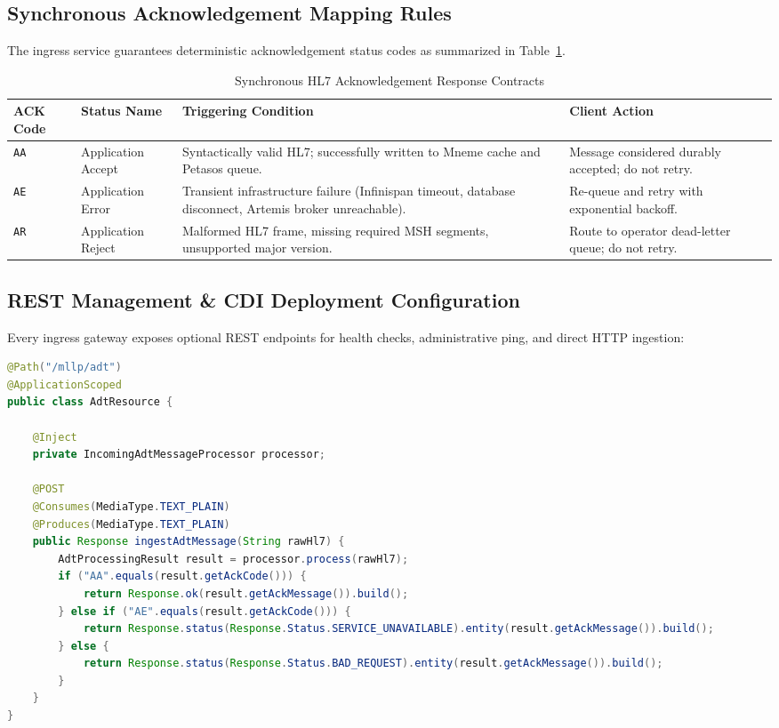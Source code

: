\subsection{Synchronous Acknowledgement Mapping Rules}

The ingress service guarantees deterministic acknowledgement status codes as summarized in Table~\ref{tab:ack_rules}.

\begin{table}[htbp]
\centering
\small
\begin{tabularx}{\textwidth}{l l p{6.0cm} p{3.0cm}}
\toprule
\textbf{ACK Code} & \textbf{Status Name} & \textbf{Triggering Condition} & \textbf{Client Action} \\
\midrule
\texttt{AA} & Application Accept & Syntactically valid HL7; successfully written to Mneme cache and Petasos queue. & Message considered durably accepted; do not retry. \\
\texttt{AE} & Application Error & Transient infrastructure failure (Infinispan timeout, database disconnect, Artemis broker unreachable). & Re-queue and retry with exponential backoff. \\
\texttt{AR} & Application Reject & Malformed HL7 frame, missing required MSH segments, unsupported major version. & Route to operator dead-letter queue; do not retry. \\
\bottomrule
\end{tabularx}
\caption{Synchronous HL7 Acknowledgement Response Contracts}
\label{tab:ack_rules}
\end{table}

\subsection{REST Management \& CDI Deployment Configuration}

Every ingress gateway exposes optional REST endpoints for health checks, administrative ping, and direct HTTP ingestion:

\begin{lstlisting}[language=Java, caption={JAX-RS Direct Ingestion Endpoint (AdtResource)}]
@Path("/mllp/adt")
@ApplicationScoped
public class AdtResource {

    @Inject
    private IncomingAdtMessageProcessor processor;

    @POST
    @Consumes(MediaType.TEXT_PLAIN)
    @Produces(MediaType.TEXT_PLAIN)
    public Response ingestAdtMessage(String rawHl7) {
        AdtProcessingResult result = processor.process(rawHl7);
        if ("AA".equals(result.getAckCode())) {
            return Response.ok(result.getAckMessage()).build();
        } else if ("AE".equals(result.getAckCode())) {
            return Response.status(Response.Status.SERVICE_UNAVAILABLE).entity(result.getAckMessage()).build();
        } else {
            return Response.status(Response.Status.BAD_REQUEST).entity(result.getAckMessage()).build();
        }
    }
}
\end{lstlisting}

